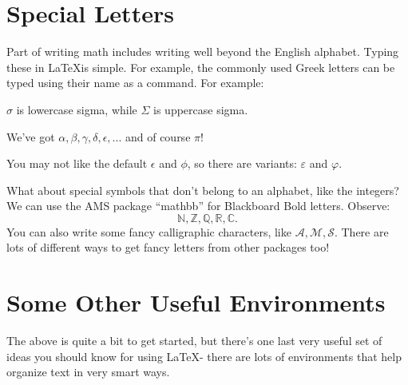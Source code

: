\documentclass[12pt]{article}
\begin{document}
	\section{Special Letters}
	
	Part of writing math includes writing well beyond the English alphabet. Typing these in \LaTeX is simple. For example, the commonly used Greek letters can be typed using their name as a command. For example:
	
	\medskip
	$\sigma$ is lowercase sigma, while $\Sigma$ is uppercase sigma. 
	
	\medskip
	We've got $\alpha, \beta, \gamma, \delta, \epsilon, ...$ and of course $\pi$!
	
	\medskip
	You may not like the default $\epsilon$ and $\phi$, so there are variants: $\varepsilon$ and $\varphi$.
	
	\bigskip
	What about special symbols that don't belong to an alphabet, like the integers? We can use the AMS package ``mathbb'' for Blackboard Bold letters. Observe:
	\[
	\mathbb{N}, \mathbb{Z}, \mathbb{Q}, \mathbb{R}, \mathbb{C}.
	\] 
	You can also write some fancy calligraphic characters, like $\mathcal{A}, \mathcal{M}, \mathcal{S}$. There are lots of different ways to get fancy letters from other packages too!
	
	\section{Some Other Useful Environments}
	
	The above is quite a bit to get started, but there's one last very useful set of ideas you should know for using \LaTeX - there are lots of environments that help organize text in very smart ways. 
	
\end{document}
